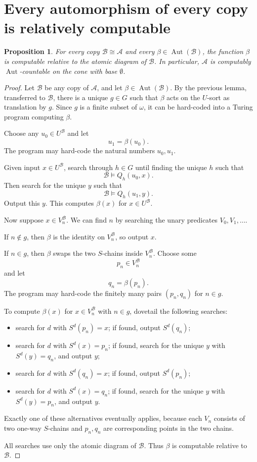 \documentclass[11pt]{article}
\newtheorem{proposition}{Proposition}
\newcommand{\Aut}{\operatorname{Aut}}
\begin{document}
\section*{Every automorphism of every copy is relatively computable}

\begin{proposition}
For every copy $\mathcal B\cong\mathcal A$ and every
$\beta\in\Aut(\mathcal B)$, the function $\beta$ is computable relative to
the atomic diagram of $\mathcal B$.  In particular, $\mathcal A$ is
computably $\Aut$-countable on the cone with base $\emptyset$.
\end{proposition}

\begin{proof}
Let $\mathcal B$ be any copy of $\mathcal A$, and let
$\beta\in\Aut(\mathcal B)$.  By the previous lemma, transferred to
$\mathcal B$, there is a unique $g\in G$ such that $\beta$ acts on the $U$-sort as translation by $g$.  Since $g$ is a finite subset of $\omega$, it can be hard-coded into a Turing program computing $\beta$.

Choose any $u_0\in U^{\mathcal B}$ and let
\[
u_1=\beta(u_0).
\]
The program may hard-code the natural numbers $u_0,u_1$.

Given input $x\in U^{\mathcal B}$, search through $h\in G$ until finding the unique $h$ such that
\[
\mathcal B\models Q_h(u_0,x).
\]
Then search for the unique $y$ such that
\[
\mathcal B\models Q_h(u_1,y).
\]
Output this $y$.  This computes $\beta(x)$ for $x\in U^{\mathcal B}$.

Now suppose $x\in V_n^{\mathcal B}$.  We can find $n$ by searching the unary predicates $V_0,V_1,\dots$.

If $n\notin g$, then $\beta$ is the identity on $V_n^{\mathcal B}$, so output $x$.

If $n\in g$, then $\beta$ swaps the two $S$-chains inside $V_n^{\mathcal B}$.  Choose some
\[
p_n\in V_n^{\mathcal B}
\]
and let
\[
q_n=\beta(p_n).
\]
The program may hard-code the finitely many pairs $(p_n,q_n)$ for $n\in g$.

To compute $\beta(x)$ for $x\in V_n^{\mathcal B}$ with $n\in g$, dovetail the following searches:
\begin{itemize}
\item search for $d$ with $S^d(p_n)=x$; if found, output $S^d(q_n)$;
\item search for $d$ with $S^d(x)=p_n$; if found, search for the unique $y$ with $S^d(y)=q_n$, and output $y$;
\item search for $d$ with $S^d(q_n)=x$; if found, output $S^d(p_n)$;
\item search for $d$ with $S^d(x)=q_n$; if found, search for the unique $y$ with $S^d(y)=p_n$, and output $y$.
\end{itemize}
Exactly one of these alternatives eventually applies, because each $V_n$ consists of two one-way $S$-chains and $p_n,q_n$ are corresponding points in the two chains.

All searches use only the atomic diagram of $\mathcal B$.  Thus $\beta$ is computable relative to $\mathcal B$.
\end{proof}
\end{document}
